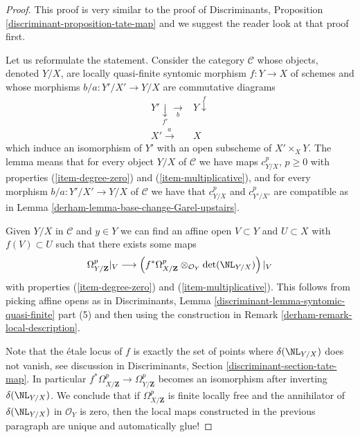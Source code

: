 \begin{proof}

This proof is very similar to the proof of
Discriminants, Proposition \ref{discriminant-proposition-tate-map}
and we suggest the reader look at that proof first.

\medskip\noindent
Let us reformulate the statement. Consider the category
$\mathcal{C}$ whose objects, denoted $Y/X$, are locally quasi-finite syntomic
morphism $f : Y \to X$ of schemes and whose morphisms
$b/a : Y'/X' \to Y/X$ are commutative diagrams
$$
\begin{array}{cc}Y' \underset{f'}{\downarrow}\underset{b}{\longrightarrow} & Y \overset{f}{\downarrow} \\ X' \overset{a}{\longrightarrow} & X\end{array}
$$
which induce an isomorphism of $Y'$ with an open subscheme of
$X' \times_X Y$. The lemma means that for every object
$Y/X$ of $\mathcal{C}$ we have maps $c^p_{Y/X}$, $p \geq 0$
with properties (\ref{item-degree-zero}) and (\ref{item-multiplicative}),
and for every morphism $b/a : Y'/X' \to Y/X$ of $\mathcal{C}$ we have
that $c^p_{Y/X}$ and $c^p_{Y'/X'}$ are compatible as in
Lemma \ref{derham-lemma-base-change-Garel-upstairs}.

\medskip\noindent
Given $Y/X$ in $\mathcal{C}$ and $y \in Y$ we can find
an affine open $V \subset Y$ and $U \subset X$ with $f(V) \subset U$
such that there exists some maps
$$
\Omega^p_{Y/\mathbf{Z}}|_V
\longrightarrow
\left(
f^*\Omega^p_{X/\mathbf{Z}} \otimes_{\mathcal{O}_Y} \det(\NL_{Y/X})
\right)|_V
$$
with properties (\ref{item-degree-zero}) and (\ref{item-multiplicative}).
This follows from picking affine opens as in
Discriminants, Lemma \ref{discriminant-lemma-syntomic-quasi-finite} part (5)
and then using the construction in Remark \ref{derham-remark-local-description}.

\medskip\noindent
Note that the \'etale locus of $f$ is exactly the set of points where
$\delta(\NL_{Y/X})$ does not vanish, see discussion in
Discriminants, Section \ref{discriminant-section-tate-map}.
In particular
$f^*\Omega^p_{X/\mathbf{Z}} \to \Omega^p_{Y/\mathbf{Z}}$
becomes an isomorphism after inverting $\delta(\NL_{Y/X})$.
We conclude that if $\Omega^p_{X/\mathbf{Z}}$ is finite locally free and
the annihilator of $\delta(\NL_{Y/X})$ in $\mathcal{O}_Y$ is zero, then
the local maps constructed in the previous paragraph
are unique and automatically glue!


\end{proof}
